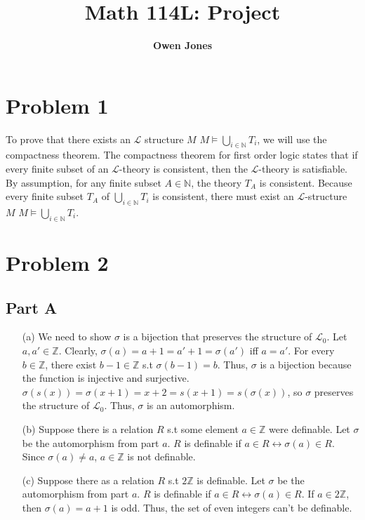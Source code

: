 \documentclass[10pt]{article}
\title{\bf Math 114L\@: Project}
\author{\bf Owen Jones}
\begin{document}
\maketitle
\section*{Problem 1}
To prove that there exists an $\mathcal{L}$ structure $M$ $M\models\bigcup_{i\in\mathbb{N}}T_i$, we will use the compactness theorem.
The compactness theorem for first order logic states that if every finite subset of an $\mathcal{L}$-theory is consistent, then the $\mathcal{L}$-theory is satisfiable.
By assumption, for any finite subset $A\in\mathbb{N}$, the theory $T_A$ is consistent. 
Because every finite subset $T_A$ of $\bigcup_{i\in\mathbb{N}}T_i$ is consistent, there must exist an $\mathcal{L}$-structure $M$ $M\models\bigcup_{i\in\mathbb{N}}T_i$.
\section*{Problem 2}
\subsection*{Part A}
\begin{itemize}
    \item [(a)] We need to show $\sigma$ is a bijection that preserves the structure of $\mathcal{L}_0$. 
    Let $a,a'\in\mathbb{Z}$. 
    Clearly, $\sigma(a)=a+1=a'+1=\sigma(a')$ iff $a=a'$. 
    For every $b\in \mathbb{Z}$, there exist $b-1\in\mathbb{Z}$ s.t $\sigma(b-1)=b$.
    Thus, $\sigma$ is a bijection because the function is injective and surjective.
    $\sigma(s(x))=\sigma(x+1)=x+2=s(x+1)=s(\sigma(x))$, so $\sigma$ preserves the structure of $\mathcal{L}_0$. 
    Thus, $\sigma$ is an automorphism.
    \item [(b)] Suppose there is a relation $R$ s.t some element $a\in\mathbb{Z}$ were definable. 
    Let $\sigma$ be the automorphism from part $a$. 
    $R$ is definable if $a\in R\leftrightarrow \sigma(a)\in R$. 
    Since $\sigma(a)\neq a$, $a\in\mathbb{Z}$ is not definable.
    \item [(c)] Suppose there as a relation $R$ s.t $2\mathbb{Z}$ is definable. 
    Let $\sigma$ be the automorphism from part $a$. 
    $R$ is definable if $a\in R\leftrightarrow\sigma(a)\in R$.
    If $a\in2\mathbb{Z}$, then $\sigma(a)=a+1$ is odd.
    Thus, the set of even integers can't be definable.
\end{itemize}
\end{document}
